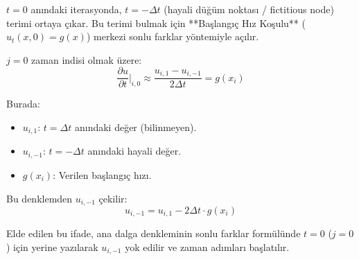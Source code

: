 \documentclass[a4paper,12pt]{article}
\begin{document}
$t=0$ anındaki iterasyonda, $t=-\Delta t$ (hayali düğüm noktası / fictitious node) terimi ortaya çıkar. Bu terimi bulmak için **Başlangıç Hız Koşulu** ($u_t(x,0) = g(x)$) merkezi sonlu farklar yöntemiyle açılır.

$j=0$ zaman indisi olmak üzere:
\[
\frac{\partial u}{\partial t}\bigg|_{i,0} \approx \frac{u_{i,1} - u_{i,-1}}{2\Delta t} = g(x_i)
\]

Burada:
\begin{itemize}
    \item $u_{i,1}$: $t=\Delta t$ anındaki değer (bilinmeyen).
    \item $u_{i,-1}$: $t=-\Delta t$ anındaki hayali değer.
    \item $g(x_i)$: Verilen başlangıç hızı.
\end{itemize}

Bu denklemden $u_{i,-1}$ çekilir:
\[
u_{i,-1} = u_{i,1} - 2\Delta t \cdot g(x_i)
\]

Elde edilen bu ifade, ana dalga denkleminin sonlu farklar formülünde $t=0$ ($j=0$) için yerine yazılarak $u_{i,-1}$ yok edilir ve zaman adımları başlatılır.
\end{document}

